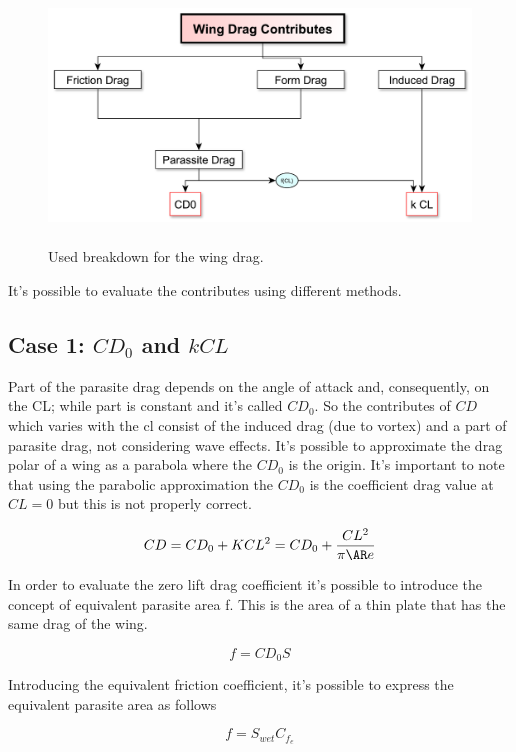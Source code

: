 \begin{figure}[H]
	\centering
	{\includegraphics[height=6cm]{Immagini/dragfactors.pdf}} 
	\caption{Used breakdown for the wing drag.}
	\label{newcomponent}
\end{figure}

It's possible to evaluate the contributes using different methods.

\subsection{Case 1:  $CD_0$  and $k CL$}
Part of the parasite drag depends on the angle of attack and, consequently, on the CL; while part is constant and it's called $CD_0$. So the contributes of $CD$ which varies with the cl consist of the induced drag (due to vortex) and a part of parasite drag, not considering wave effects. It's possible to approximate the drag polar of a wing as a parabola where the $CD_0$ is the origin. It's important to note that using the parabolic approximation the $CD_0$ is the coefficient drag value at $CL=0$ but this is not properly correct.

\begin{equation}
CD = CD_0 + KCL^2 = CD_0 + \frac{CL^2}{\pi \AR e}
\end{equation}

In order to evaluate the zero lift drag coefficient it's possible to introduce the concept of equivalent parasite area f. This is the area of a thin plate that has the same drag of the wing.

\begin{equation}
f = CD_0 S
\label{cd01}
\end{equation}

Introducing the equivalent friction coefficient, it's possible to express the equivalent parasite area as follows

\begin{equation}
f= S_{wet} C_{f_{e}}
\label{cd02}
\end{equation}


